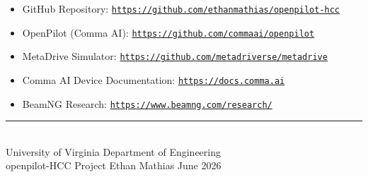 \documentclass[12pt]{article}
\begin{document}
\begin{itemize}
  \item GitHub Repository: \href{https://github.com/ethanmathias/openpilot-hcc}{\texttt{https://github.com/ethanmathias/openpilot-hcc}}
  \item OpenPilot (Comma AI): \href{https://github.com/commaai/openpilot}{\texttt{https://github.com/commaai/openpilot}}
  \item MetaDrive Simulator: \href{https://github.com/metadriverse/metadrive}{\texttt{https://github.com/metadriverse/metadrive}}
  \item Comma AI Device Documentation: \href{https://docs.comma.ai}{\texttt{https://docs.comma.ai}}
  \item BeamNG Research: \href{https://www.beamng.com/research/}{\texttt{https://www.beamng.com/research/}}
\end{itemize}

\vfill
\begin{center}
  \color{darkgray}\small
  \rule{0.4\linewidth}{0.4pt}\\[0.5em]
  University of Virginia \textbullet{} Department of Engineering\\
  openpilot-HCC Project \textbullet{} Ethan Mathias \textbullet{} June 2026
\end{center}
\end{document}

